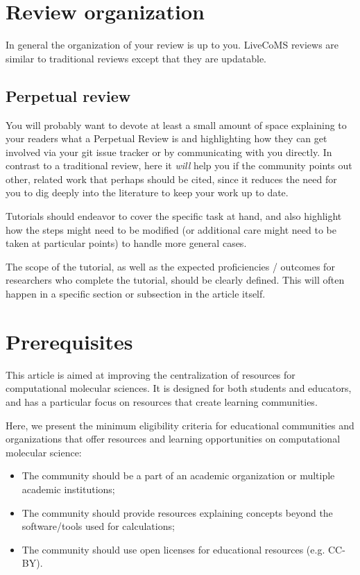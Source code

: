 \documentclass[9pt,review]{livecoms}
\begin{document}
\section{Review organization}

In general the organization of your review is up to you.
LiveCoMS reviews are similar to traditional reviews except that they are updatable.

\subsection{Perpetual review}

You will probably want to devote at least a small amount of space explaining to your readers what a Perpetual Review is and highlighting how they can get involved via your git issue tracker or by communicating with you directly.
In contrast to a traditional review, here it \emph{will} help you if the community points out other, related work that perhaps should be cited, since it reduces the need for you to dig deeply into the literature to keep your work up to date.

Tutorials should endeavor to cover the specific task at hand, and also highlight how the steps might need to be modified (or additional care might need to be taken at particular points) to handle more general cases.

The scope of the tutorial, as well as the expected proficiencies / outcomes for researchers who complete the tutorial, should be clearly defined.
This will often happen in a specific section or subsection in the article itself.

\section{Prerequisites}


This article is aimed at improving the centralization of resources for computational molecular sciences. It is designed for both students and educators, and has a particular focus on resources that create learning communities. 

Here, we present the minimum eligibility criteria for educational communities and organizations that offer resources and learning opportunities on computational molecular science:
\begin{itemize}
\item The community should be a part of an academic organization or multiple academic institutions;
\item The community should provide resources explaining concepts beyond the software/tools used for calculations;
\item The community should use open licenses for educational resources (e.g. CC-BY). 
\end{itemize}
\end{document}
